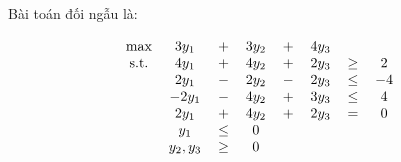 Bài toán đối ngẫu là: 

\begin{align*}
    \begin{tabular}{cccccccc}
        \text{max} & $3y_1$ & $+$ & $3y_2$ & $+$ & $4y_3$ \\
        \text{s.t.} & $4y_1$ & $+$ & $4y_2$ & $+$ & $2y_3$ & $\geq$ & $2$ \\
        & $2y_1$ & $-$ & $2y_2$ & $-$ & $2y_3$ & $\leq$ & $-4$ \\
        & $-2y_1$ & $-$ & $4y_2$ & $+$ & $3y_3$ & $\leq$ & $4$ \\
        & $2y_1$ & $+$ & $4y_2$ & $+$ & $2y_3$ & $=$ & $0$ \\
        & $y_1$ & $\leq$ & $0$ & & & & \\
        & $y_2,y_3$ & $\geq$ & $0$ & & & & \\
    \end{tabular}
\end{align*}